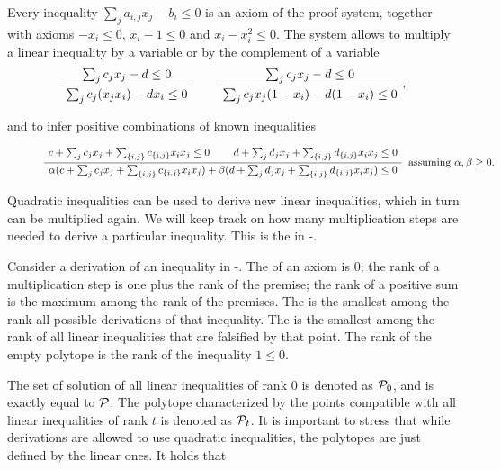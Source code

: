 \documentclass[a4paper,twoside,justified]{tufte-handout}
\begin{document}
Every inequality $ \sum_{j}a_{i,j}x_{j} - b_{i} \leq 0$ is an axiom of
the proof system, together with axioms $ - x_{i} \leq 0$, $ x_{i} - 1
\leq 0$ and $ x_{i} - x^{2}_{i} \leq 0$.  The system allows to multiply a
linear inequality by a variable or by the complement of a variable
\begin{equation}\label{eq:lsmultiplication}
\AxiomC{$\sum_{j}c_{j} x_{j} - d \leq 0$}
\UnaryInfC{$ \sum_{j}c_{j}(x_{j}x_{i}) - d x_{i} \leq 0$}
\DisplayProof
\qquad
\AxiomC{$ \sum_{j}c_{j} x_{j} - d \leq 0$}
\UnaryInfC{$ \sum_{j}c_{j}x_{j}(1-x_{i}) - d (1-x_{i}) \leq 0$}
\DisplayProof,
\end{equation}

and to infer positive combinations of known inequalities

\begin{figure*}
\begin{equation}
\RightLabel{\ assuming $\alpha, \beta \geq 0$.}
\AxiomC{$c+\sum_{j}c_{j} x_{j} + \sum_{\{i,j\}} c_{\{i,j\}}x_{i}x_{j}\leq 0$}
\AxiomC{$d+\sum_{j}d_{j} x_{j} + \sum_{\{i,j\}} d_{\{i,j\}}x_{i}x_{j}\leq 0$}
\BinaryInfC{%
$\alpha (c+\sum_{j}c_{j} x_{j} + \sum_{\{i,j\}} c_{\{i,j\}}x_{i}x_{j})+
\beta (d+\sum_{j}d_{j} x_{j} + \sum_{\{i,j\}} d_{\{i,j\}}x_{i}x_{j}) \leq 0$}
\DisplayProof
\end{equation}
\end{figure*}

Quadratic inequalities can be used to derive new linear inequalities,
which in turn can be multiplied again. We will keep track on how many
multiplication steps are needed to derive a particular
inequality. This is the  in
\Lovasz-\Schrijver.

\begin{definition}
  Consider a derivation of an inequality in \Lovasz-\Schrijver. The
   of an axiom is $ 0 $; the rank of
  a multiplication step is one plus the rank of the premise; the rank
  of a positive sum is the maximum among the rank of the premises.
  The  is the smallest among the
  rank all possible derivations of that inequality. The
   is the smallest among the rank of
  all linear inequalities that are falsified by that point. The rank
  of the empty polytope is the rank of the inequality $ 1 \leq 0 $.
\end{definition}

The set of solution of all linear inequalities of rank $ 0 $ is
denoted as $ \mathcal{P}_{0} $, and is exactly equal to $ \mathcal{P} $. The
polytope characterized by the points compatible with all linear
inequalities of rank $ t $ is denoted as $ \mathcal{P}_{t} $. It is
important to stress that while derivations are allowed to use
quadratic inequalities, the polytopes are just defined by the linear
ones. It holds that
\end{document}
